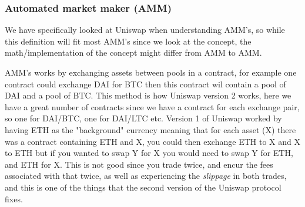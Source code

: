 \subsubsection{Automated market maker (AMM)}
We have specifically looked at Uniswap when understanding AMM's, so while this definition will fit most AMM's since we look at the concept, the math/implementation of the concept might differ from AMM to AMM.

AMM's works by exchanging assets between pools in a contract, for example one contract could exchange DAI for BTC then this contract wil contain a pool of DAI and a pool of BTC. This method is how Uniswap version 2 works, here we have a great number of contracts since we have a contract for each exchange pair, so one for DAI/BTC, one for DAI/LTC etc. Version 1 of Uniswap worked by having ETH as the "background" currency meaning that for each asset (X) there was a contract containing ETH and X, you could then exchange ETH to X and X to ETH but if you wanted to swap Y for X you would need to swap Y for ETH, and ETH for X. This is not good since you trade twice, and encur the fees associated with that twice, as well as experiencing the \textit{slippage} in both trades, and this is one of the things that the second version of the Uniswap protocol fixes.

